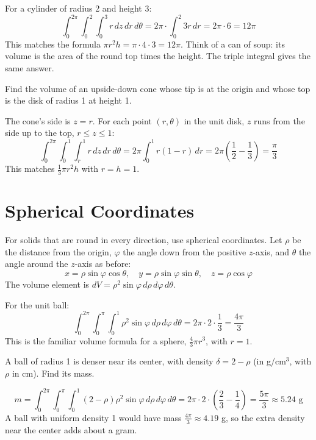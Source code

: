 For a cylinder of radius 2 and height 3:
$$\int_0^{2\pi} \int_0^2 \int_0^3 r\,dz\,dr\,d\theta
= 2\pi \cdot \int_0^2 3r\,dr = 2\pi \cdot 6 = 12\pi$$
This matches the formula $\pi r^2 h = \pi \cdot 4 \cdot 3 = 12\pi$. Think of a can of soup: its volume is the area of the round top times the height. The triple integral gives the same answer.

\begin{Worked}
\begin{Problem}
Find the volume of an upside-down cone whose tip is at the
origin and whose top is the disk of radius 1 at height 1.
\end{Problem}
\begin{Solution}
The cone's side is $z = r$. For each point $(r, \theta)$ in
the unit disk, $z$ runs from the side up to the top, $r \leq z \leq 1$:
$$\int_0^{2\pi}\int_0^1\int_r^1 r\,dz\,dr\,d\theta = 2\pi\int_0^1 r(1 - r)\,dr
= 2\pi\left(\frac{1}{2} - \frac{1}{3}\right) = \frac{\pi}{3}$$
This matches $\frac{1}{3}\pi r^2 h$ with $r = h = 1$.
\end{Solution}
\end{Worked}

\section{Spherical Coordinates}
For solids that are round in every direction, use spherical coordinates. Let
$\rho$ be the distance from the origin, $\varphi$ the angle down from the positive
$z$-axis, and $\theta$ the angle around the $z$-axis as before:
$$x = \rho\sin\varphi\cos\theta, \quad y = \rho\sin\varphi\sin\theta, \quad
z = \rho\cos\varphi$$
The volume element is $dV = \rho^2\sin\varphi\,d\rho\,d\varphi\,d\theta$.

For the unit ball:
$$\int_0^{2\pi} \int_0^{\pi} \int_0^1 \rho^2\sin\varphi\,d\rho\,d\varphi\,d\theta
= 2\pi \cdot 2 \cdot \frac{1}{3} = \frac{4\pi}{3}$$
This is the familiar volume formula for a sphere, $\frac{4}{3}\pi r^3$, with $r = 1$.

\begin{Worked}
\begin{Problem}
A ball of radius 1 is denser near its center, with density
$\delta = 2 - \rho$ (in g/cm$^3$, with $\rho$ in cm). Find its mass.
\end{Problem}
\begin{Solution}
$$m = \int_0^{2\pi}\int_0^{\pi}\int_0^1 (2 - \rho)\rho^2\sin\varphi\,d\rho\,d\varphi\,d\theta
= 2\pi \cdot 2 \cdot \left(\frac{2}{3} - \frac{1}{4}\right) = \frac{5\pi}{3} \approx 5.24 \text{ g}$$
A ball with uniform density 1 would have mass $\frac{4\pi}{3} \approx 4.19$ g, so
the extra density near the center adds about a gram.
\end{Solution}
\end{Worked}


